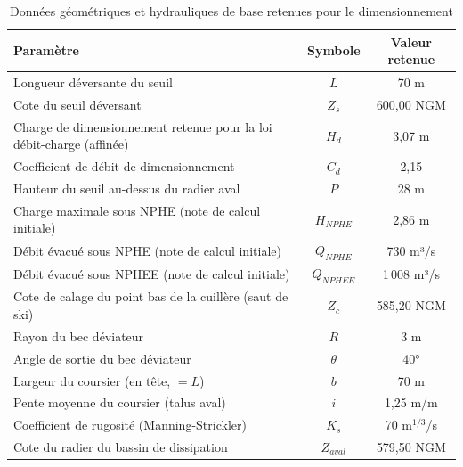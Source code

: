\begin{table}[H]
    \centering
    \caption{Données géométriques et hydrauliques de base retenues pour le dimensionnement}
    \label{tab:donnees_base}
    \begin{tabular}{|l|c|c|}
        \hline
        \textbf{Paramètre} & \textbf{Symbole} & \textbf{Valeur retenue} \\
        \hline
        Longueur déversante du seuil & $L$ & 70 m \\
        \hline
        Cote du seuil déversant & $Z_s$ & 600,00 NGM \\
        \hline
        Charge de dimensionnement retenue pour la loi débit-charge (affinée) & $H_d$ & 3,07 m \\
        \hline
        Coefficient de débit de dimensionnement & $C_d$ & 2,15 \\
        \hline
        Hauteur du seuil au-dessus du radier aval & $P$ & 28 m \\
        \hline
        Charge maximale sous NPHE (note de calcul initiale) & $H_{NPHE}$ & 2,86 m \\
        \hline
        Débit évacué sous NPHE (note de calcul initiale) & $Q_{NPHE}$ & 730 m³/s \\
        \hline
        Débit évacué sous NPHEE (note de calcul initiale) & $Q_{NPHEE}$ & 1\,008 m³/s \\
        \hline
        Cote de calage du point bas de la cuillère (saut de ski) & $Z_c$ & 585,20 NGM \\
        \hline
        Rayon du bec déviateur & $R$ & 3 m \\
        \hline
        Angle de sortie du bec déviateur & $\theta$ & 40° \\
        \hline
        Largeur du coursier (en tête, $=L$) & $b$ & 70 m \\
        \hline
        Pente moyenne du coursier (talus aval) & $i$ & 1,25 m/m \\
        \hline
        Coefficient de rugosité (Manning-Strickler) & $K_s$ & 70 m$^{1/3}$/s \\
        \hline
        Cote du radier du bassin de dissipation & $Z_{aval}$ & 579,50 NGM \\
        \hline
    \end{tabular}
\end{table}

